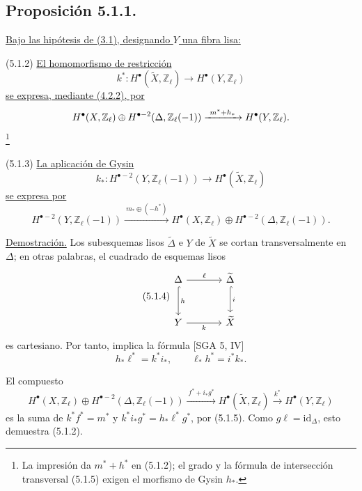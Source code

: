 \pageoriginale

\subsection*{Proposición 5.1.1.}
\underline{Bajo las hipótesis de (3.1), designando $Y$ una fibra lisa:}

\smallskip
\noindent
\textup{(5.1.2)} \underline{El homomorfismo de restricción}
\[
k^*:H^\bullet(\widetilde X,\mathbb Z_\ell)
   \longrightarrow H^\bullet(Y,\mathbb Z_\ell)
\]
\underline{se expresa, mediante (4.2.2), por}
\[
H^\bullet(X,\mathbb Z_\ell)\oplus
H^{\bullet-2}(\Delta,\mathbb Z_\ell(-1))
\xrightarrow{\ m^*+\sisi{h^*}{h_*}\ }
H^\bullet(Y,\mathbb Z_\ell).
\]
\footnote{La impresión da $m^*+h^*$ en (5.1.2); el grado y la fórmula
de intersección transversal (5.1.5) exigen el morfismo de Gysin $h_*$.}

\noindent
\textup{(5.1.3)} \underline{La aplicación de Gysin}
\[
k_*:H^{\bullet-2}(Y,\mathbb Z_\ell(-1))
   \longrightarrow H^\bullet(\widetilde X,\mathbb Z_\ell)
\]
\underline{se expresa por}
\[
H^{\bullet-2}(Y,\mathbb Z_\ell(-1))
\xrightarrow{\ m_*\oplus(-h^*)\ }
H^\bullet(X,\mathbb Z_\ell)\oplus
H^{\bullet-2}(\Delta,\mathbb Z_\ell(-1)).
\]

\noindent\underline{Demostración.}
Los subesquemas lisos $\widetilde\Delta$ e $Y$ de $\widetilde X$ se
cortan transversalmente en $\Delta$; en otras palabras, el cuadrado de
esquemas lisos
\begin{equation}\tag{5.1.4}
\begin{tikzcd}[column sep=large,row sep=large]
\Delta\arrow[r,"\ell"]\arrow[d,hook,"h"]
  &\widetilde\Delta\arrow[d,hook,"i"]\\
Y\arrow[r,"k"']&\widetilde X
\end{tikzcd}
\end{equation}
es cartesiano. Por tanto, implica la fórmula [SGA 5, IV]
\begin{equation}\tag{5.1.5}
h_*\ell^*=k^*i_* ,\qquad \ell_*h^*=i^*k_*.
\end{equation}

\pageoriginale

El compuesto
\[
H^\bullet(X,\mathbb Z_\ell)\oplus
H^{\bullet-2}(\Delta,\mathbb Z_\ell(-1))
\xrightarrow{\ f^*+i_*g^*\ }
H^\bullet(\widetilde X,\mathbb Z_\ell)
\xrightarrow{\ k^*\ }
H^\bullet(Y,\mathbb Z_\ell)
\]
es la suma de $k^*f^*=m^*$ y
$k^*i_*g^*=h_*\ell^*g^*$, por (5.1.5). Como
$g\ell=\mathrm{id}_\Delta$, esto demuestra (5.1.2).

